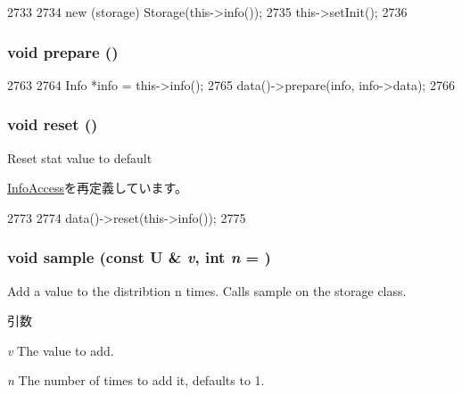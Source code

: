 \begin{DoxyCode}
2733     {
2734         new (storage) Storage(this->info());
2735         this->setInit();
2736     }
\end{DoxyCode}
\hypertarget{classStats_1_1SparseHistBase_a1825b40ca3bc3a1ba67fdb58fac5015c}{
\subsubsection[{prepare}]{\setlength{\rightskip}{0pt plus 5cm}void prepare ()}}
\label{classStats_1_1SparseHistBase_a1825b40ca3bc3a1ba67fdb58fac5015c}



\begin{DoxyCode}
2763     {
2764         Info *info = this->info();
2765         data()->prepare(info, info->data);
2766     }
\end{DoxyCode}
\hypertarget{classStats_1_1SparseHistBase_ad20897c5c8bd47f5d4005989bead0e55}{
\subsubsection[{reset}]{\setlength{\rightskip}{0pt plus 5cm}void reset ()}}
\label{classStats_1_1SparseHistBase_ad20897c5c8bd47f5d4005989bead0e55}
Reset stat value to default 

\hyperlink{classStats_1_1InfoAccess_ad20897c5c8bd47f5d4005989bead0e55}{InfoAccess}を再定義しています。


\begin{DoxyCode}
2773     {
2774         data()->reset(this->info());
2775     }
\end{DoxyCode}
\hypertarget{classStats_1_1SparseHistBase_afed4e1e09f566c5aa9e972d8c17b5a27}{
\subsubsection[{sample}]{\setlength{\rightskip}{0pt plus 5cm}void sample (const U \& {\em v}, \/  int {\em n} = {})}}
\label{classStats_1_1SparseHistBase_afed4e1e09f566c5aa9e972d8c17b5a27}
Add a value to the distribtion n times. Calls sample on the storage class. 
\begin{DoxyParams}{引数}
\item[{\em v}]The value to add. \item[{\em n}]The number of times to add it, defaults to 1. \end{DoxyParams}



